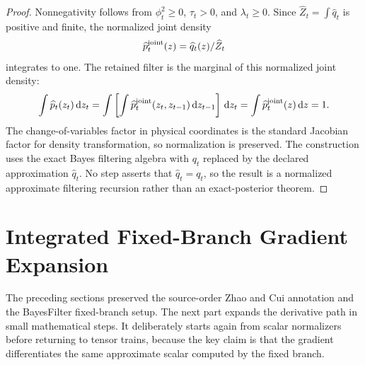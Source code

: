 \documentclass[11pt]{article}
\newcommand{\dd}{\,\mathrm d}
\begin{document}
\begin{proof}
Nonnegativity follows from
\(\phi_t^2\ge0\), \(\tau_t>0\), and \(\lambda_t\ge0\).  Since
\(\widehat Z_t=\int\widehat q_t\) is positive and finite, the normalized joint
density
\[
    \widehat p_t^{\rm joint}(z)
    =
    \widehat q_t(z)/\widehat Z_t
\]
integrates to one.  The retained filter is the marginal of this normalized
joint density:
\[
    \int \widehat p_t(z_t)\dd z_t
    =
    \int
    \left[
    \int \widehat p_t^{\rm joint}(z_t,z_{t-1})\dd z_{t-1}
    \right]\dd z_t
    =
    \int \widehat p_t^{\rm joint}(z)\dd z
    =
    1.
\]
The change-of-variables factor in physical coordinates is the standard
Jacobian factor for density transformation, so normalization is preserved.  The
construction uses the exact Bayes filtering algebra with \(q_t\) replaced by
the declared approximation \(\widehat q_t\).  No step asserts that
\(\widehat q_t=q_t\), so the result is a normalized approximate filtering
recursion rather than an exact-posterior theorem.
\end{proof}


\section{Integrated Fixed-Branch Gradient Expansion}

The preceding sections preserved the source-order Zhao and Cui \cite{zhao2024ttsequential} annotation and the
BayesFilter fixed-branch setup.  The next part expands the derivative path in
small mathematical steps.  It deliberately starts again from scalar
normalizers before returning to tensor trains, because the key claim is that
the gradient differentiates the same approximate scalar computed by the fixed
branch.
\end{document}
